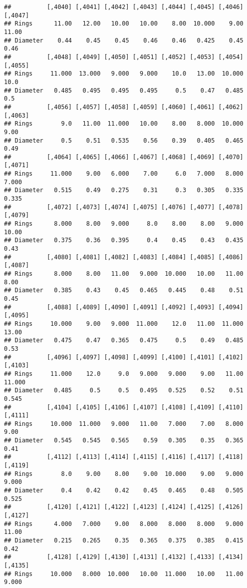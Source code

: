 \documentclass[
]{article}
\begin{document}
\begin{verbatim}
##          [,4040] [,4041] [,4042] [,4043] [,4044] [,4045] [,4046] [,4047]
## Rings      11.00   12.00   10.00   10.00    8.00  10.000    9.00   11.00
## Diameter    0.44    0.45    0.45    0.46    0.46   0.425    0.45    0.46
##          [,4048] [,4049] [,4050] [,4051] [,4052] [,4053] [,4054] [,4055]
## Rings     11.000  13.000   9.000   9.000    10.0   13.00  10.000    10.0
## Diameter   0.485   0.495   0.495   0.495     0.5    0.47   0.485     0.5
##          [,4056] [,4057] [,4058] [,4059] [,4060] [,4061] [,4062] [,4063]
## Rings        9.0   11.00  11.000   10.00    8.00   8.000  10.000    9.00
## Diameter     0.5    0.51   0.535    0.56    0.39   0.405   0.465    0.49
##          [,4064] [,4065] [,4066] [,4067] [,4068] [,4069] [,4070] [,4071]
## Rings     11.000    9.00   6.000    7.00     6.0   7.000   8.000   7.000
## Diameter   0.515    0.49   0.275    0.31     0.3   0.305   0.335   0.335
##          [,4072] [,4073] [,4074] [,4075] [,4076] [,4077] [,4078] [,4079]
## Rings      8.000    8.00   9.000     8.0    8.00    8.00   9.000   10.00
## Diameter   0.375    0.36   0.395     0.4    0.45    0.43   0.435    0.43
##          [,4080] [,4081] [,4082] [,4083] [,4084] [,4085] [,4086] [,4087]
## Rings      8.000    8.00   11.00   9.000  10.000   10.00   11.00    8.00
## Diameter   0.385    0.43    0.45   0.465   0.445    0.48    0.51    0.45
##          [,4088] [,4089] [,4090] [,4091] [,4092] [,4093] [,4094] [,4095]
## Rings     10.000    9.00   9.000  11.000    12.0   11.00  11.000   13.00
## Diameter   0.475    0.47   0.365   0.475     0.5    0.49   0.485    0.53
##          [,4096] [,4097] [,4098] [,4099] [,4100] [,4101] [,4102] [,4103]
## Rings     11.000    12.0     9.0   9.000   9.000    9.00   11.00  11.000
## Diameter   0.485     0.5     0.5   0.495   0.525    0.52    0.51   0.545
##          [,4104] [,4105] [,4106] [,4107] [,4108] [,4109] [,4110] [,4111]
## Rings     10.000  11.000   9.000   11.00   7.000    7.00   8.000    9.00
## Diameter   0.545   0.545   0.565    0.59   0.305    0.35   0.365    0.41
##          [,4112] [,4113] [,4114] [,4115] [,4116] [,4117] [,4118] [,4119]
## Rings        8.0    9.00    8.00    9.00  10.000    9.00   9.000   9.000
## Diameter     0.4    0.42    0.42    0.45   0.465    0.48   0.505   0.525
##          [,4120] [,4121] [,4122] [,4123] [,4124] [,4125] [,4126] [,4127]
## Rings      4.000   7.000    9.00   8.000   8.000   8.000   9.000   11.00
## Diameter   0.215   0.265    0.35   0.365   0.375   0.385   0.415    0.42
##          [,4128] [,4129] [,4130] [,4131] [,4132] [,4133] [,4134] [,4135]
## Rings     10.000   8.000  10.000   10.00  11.000   10.00   11.00   9.000

\end{verbatim}
\end{document}
